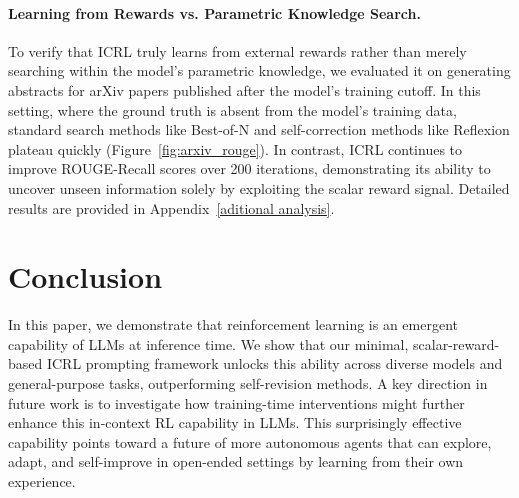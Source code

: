\documentclass{article} %
\newcommand{\sz}[1]{({\color{red} {Shangtong: #1}})}
\newcommand{\0}{\mathbf{0}}
\begin{document}


\vspace{-.25cm}
\newpage

\paragraph{Learning from Rewards vs. Parametric Knowledge Search.} 
To verify that ICRL truly learns from external rewards rather than merely searching within the model's parametric knowledge, we evaluated it on generating abstracts for arXiv papers published after the model's training cutoff. In this setting, where the ground truth is absent from the model's training data, standard search methods like Best-of-N and self-correction methods like Reflexion plateau quickly (Figure~\ref{fig:arxiv_rouge}). In contrast, ICRL continues to improve ROUGE-Recall scores over 200 iterations, demonstrating its ability to uncover unseen information solely by exploiting the scalar reward signal. Detailed results are provided in Appendix~\ref{aditional analysis}.
\section{Conclusion}
In this paper, we demonstrate that reinforcement learning is an emergent capability of LLMs at inference time. We show that our minimal, scalar-reward-based ICRL prompting framework unlocks this ability across diverse models and general-purpose tasks, outperforming self-revision methods. A key direction in future work is to investigate how training-time interventions might further enhance this in-context RL capability in LLMs. This surprisingly effective capability points toward a future of more autonomous agents that can explore, adapt, and self-improve in open-ended settings by learning from their own experience. 
\end{document}
